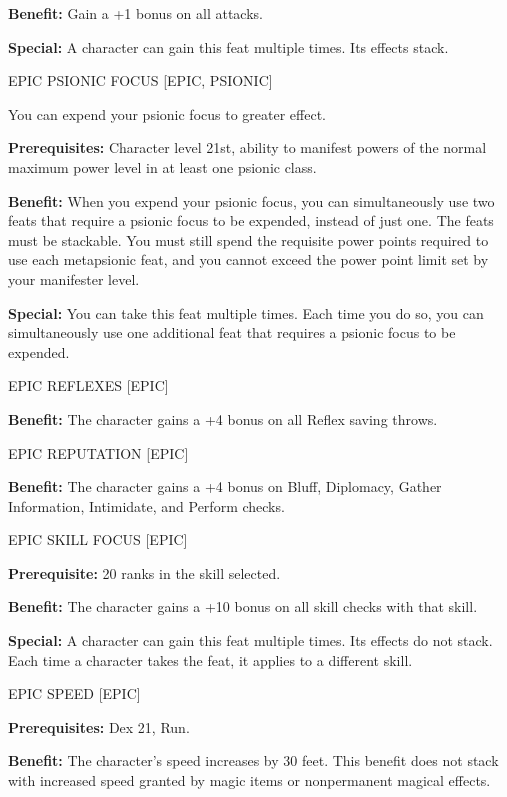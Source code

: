 \documentclass{article}
\begin{document}
\textbf{Benefit:} Gain a +1 bonus on all attacks. 

\textbf{Special:} A character can gain this feat multiple times. Its effects stack. 

\vspace{12pt}
EPIC PSIONIC FOCUS [EPIC, PSIONIC]

You can expend your psionic focus to greater effect.

\textbf{Prerequisites:} Character level 21st, ability to manifest powers of the 
normal maximum power level in at least one psionic class.

\textbf{Benefit:} When you expend your psionic focus, you can simultaneously use 
two feats that require a psionic focus to be expended, instead of just one. The 
feats must be stackable. You must still spend the requisite power points required 
to use each metapsionic feat, and you cannot exceed the power point limit set by 
your manifester level.

\textbf{Special:} You can take this feat multiple times. Each time you do so, you 
can simultaneously use one additional feat that requires a psionic focus to be 
expended.

\vspace{12pt}
EPIC REFLEXES [EPIC] 

\textbf{Benefit:} The character gains a +4 bonus on all Reflex saving throws. 

\vspace{12pt}
EPIC REPUTATION [EPIC] 

\textbf{Benefit:} The character gains a +4 bonus on Bluff, Diplomacy, Gather Information, 
Intimidate, and Perform checks. 

\vspace{12pt}
EPIC SKILL FOCUS [EPIC] 

\textbf{Prerequisite:} 20 ranks in the skill selected. 

\textbf{Benefit:} The character gains a +10 bonus on all skill checks with that 
skill. 

\textbf{Special:} A character can gain this feat multiple times. Its effects do 
not stack. Each time a character takes the feat, it applies to a different skill. 

\vspace{12pt}
EPIC SPEED [EPIC] 

\textbf{Prerequisites:} Dex 21, Run. 

\textbf{Benefit:} The character's speed increases by 30 feet. This benefit does 
not stack with increased speed granted by magic items or nonpermanent magical effects. 
\end{document}
